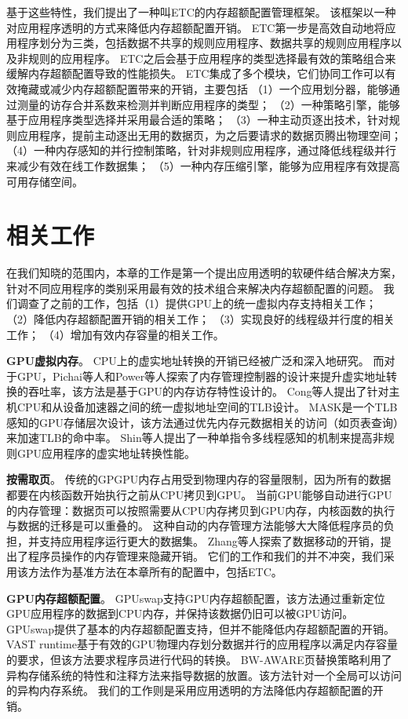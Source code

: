 基于这些特性，我们提出了一种叫ETC的内存超额配置管理框架。
该框架以一种对应用程序透明的方式来降低内存超额配置开销。
ETC第一步是高效自动地将应用程序划分为三类，包括数据不共享的规则应用程序、数据共享的规则应用程序以及非规则的应用程序。
ETC之后会基于应用程序的类型选择最有效的策略组合来缓解内存超额配置导致的性能损失。
ETC集成了多个模块，它们协同工作可以有效掩藏或减少内存超额配置带来的开销，主要包括
（1）一个应用划分器，能够通过测量的访存合并系数来检测并判断应用程序的类型；
（2）一种策略引擎，能够基于应用程序类型选择并采用最合适的策略；
（3）一种主动页逐出技术，针对规则应用程序，提前主动逐出无用的数据页，为之后要请求的数据页腾出物理空间；
（4）一种内存感知的并行控制策略，针对非规则应用程序，通过降低线程级并行来减少有效在线工作数据集；
（5）一种内存压缩引擎，能够为应用程序有效提高可用存储空间。



\section{相关工作}

在我们知晓的范围内，本章的工作是第一个提出应用透明的软硬件结合解决方案，针对不同应用程序的类别采用最有效的技术组合来解决内存超额配置的问题。
我们调查了之前的工作，包括（1）提供GPU上的统一虚拟内存支持相关工作；
（2）降低内存超额配置开销的相关工作；
（3）实现良好的线程级并行度的相关工作；
（4）增加有效内存容量的相关工作。

\textbf{GPU虚拟内存}。
CPU上的虚实地址转换的开销已经被广泛和深入地研究。
而对于GPU，Pichai等人和Power等人探索了内存管理控制器的设计来提升虚实地址转换的吞吐率，该方法是基于GPU的内存访存特性设计的。
Cong等人提出了针对主机CPU和从设备加速器之间的统一虚拟地址空间的TLB设计。
MASK是一个TLB感知的GPU存储层次设计，该方法通过优先内存元数据相关的访问（如页表查询）来加速TLB的命中率。
Shin等人提出了一种单指令多线程感知的机制来提高非规则GPU应用程序的虚实地址转换性能。

\textbf{按需取页}。
传统的GPGPU内存占用受到物理内存的容量限制，因为所有的数据都要在内核函数开始执行之前从CPU拷贝到GPU。
当前GPU能够自动进行GPU的内存管理：数据页可以按照需要从CPU内存拷贝到GPU内存，内核函数的执行与数据的迁移是可以重叠的。
这种自动的内存管理方法能够大大降低程序员的负担，并支持应用程序运行更大的数据集。
Zhang等人探索了数据移动的开销，提出了程序员操作的内存管理来隐藏开销。
它们的工作和我们的并不冲突，我们采用该方法作为基准方法在本章所有的配置中，包括ETC。

\textbf{GPU内存超额配置}。
GPUswap支持GPU内存超额配置，该方法通过重新定位GPU应用程序的数据到CPU内存，并保持该数据仍旧可以被GPU访问。
GPUswap提供了基本的内存超额配置支持，但并不能降低内存超额配置的开销。
VAST runtime基于有效的GPU物理内存划分数据并行的应用程序以满足内存容量的要求，但该方法要求程序员进行代码的转换。
BW-AWARE页替换策略利用了异构存储系统的特性和注释方法来指导数据的放置。该方法针对一个全局可以访问的异构内存系统。
我们的工作则是采用应用透明的方法降低内存超额配置的开销。

